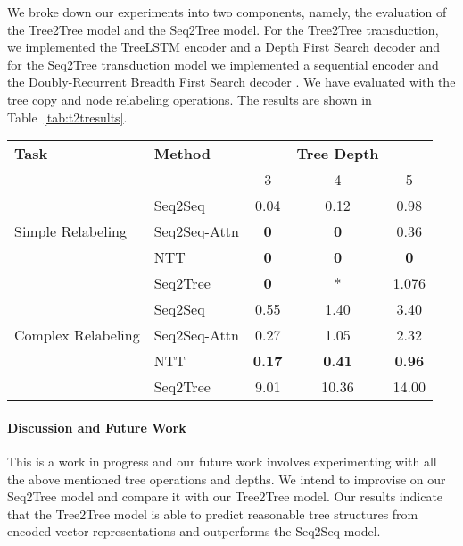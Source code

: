 \documentclass[11pt,a4paper]{article}
\begin{document}
We broke down our experiments into two components, namely, the evaluation of the Tree2Tree model and the Seq2Tree model. For the Tree2Tree transduction, we implemented the TreeLSTM encoder \citep{Zhang2015-bg} and a Depth First Search decoder and for the Seq2Tree transduction model we implemented a sequential encoder and the Doubly-Recurrent Breadth First Search decoder \citep{alvarez2017tree}. We have evaluated with the tree copy and node relabeling operations. The results are shown in Table~\ref{tab:t2tresults}.
\begin{table*}[bht!]
    \centering
    \begin{tabular}{l l|c c c }
         {\bf Task} & {\bf Method} &  & {\bf Tree Depth}  & \\ 
         & & 3 & 4 & 5  \\ \hline
         & Seq2Seq & 0.04& 0.12 & 0.98 \\
         Simple Relabeling & Seq2Seq-Attn & {\bf 0} & {\bf 0} & 0.36 \\
         & NTT & {\bf 0} & {\bf 0} & {\bf 0} \\  & Seq2Tree & {\bf 0} & * & 1.076 \\ \hline
         & Seq2Seq & 0.55 & 1.40 & 3.40 \\
         Complex Relabeling & Seq2Seq-Attn & 0.27 & 1.05 & 2.32 \\
         & NTT & {\bf 0.17} & {\bf 0.41} & {\bf 0.96} \\
          & Seq2Tree & 9.01 & 10.36 &  14.00 \\ \hline
         
         
    \end{tabular}
    \caption{Tree edit distance for the tree tasks of tree copying (Copy),  node relabeling (Relabeling). The models are sequence-to-sequence
    (Seq2Seq), sequence-to-sequence with attention
    (Seq2Seq-Attn), and our neural tree2tree transducer method (NTT) and our Seq2Tree transducer method. * indicates work in progress.}
    \label{tab:t2tresults}
\end{table*}
\paragraph{Discussion and Future Work}
This is a work in progress and our future work involves experimenting with all the above mentioned tree operations and depths. We intend to improvise on our Seq2Tree model and compare it with our Tree2Tree model. Our results indicate that the Tree2Tree model is able to predict reasonable tree structures from encoded vector representations and outperforms the Seq2Seq model.







\end{document}
